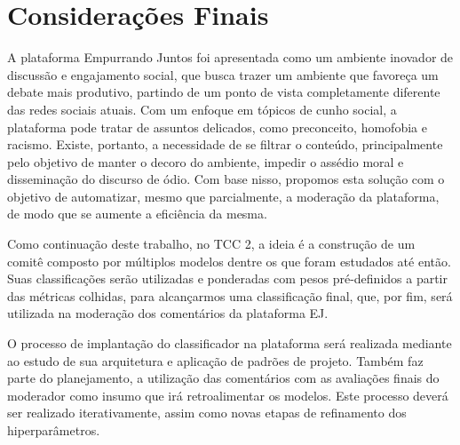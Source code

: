 \chapter{Considerações Finais}

A plataforma Empurrando Juntos foi apresentada como um ambiente inovador de discussão e engajamento social, que busca trazer um ambiente que favoreça um debate mais produtivo, partindo de um ponto de vista completamente diferente das redes sociais atuais. Com um enfoque em tópicos de cunho social, a plataforma pode tratar de assuntos delicados, como preconceito, homofobia e racismo. Existe, portanto, a necessidade de se filtrar o conteúdo, principalmente pelo objetivo de manter o decoro do ambiente, impedir o assédio moral e disseminação do discurso de ódio. Com base nisso, propomos esta solução com o objetivo de automatizar, mesmo que parcialmente, a moderação da plataforma, de modo que se aumente a eficiência da mesma.

Como continuação deste trabalho, no TCC 2, a ideia é a construção de um comitê composto por múltiplos modelos dentre os que foram estudados até então. Suas classificações serão utilizadas e ponderadas com pesos pré-definidos a partir das métricas colhidas, para alcançarmos uma classificação final, que, por fim, será utilizada na moderação dos comentários da plataforma EJ.
	
O processo de implantação do classificador na plataforma será realizada mediante ao estudo de sua arquitetura e aplicação de padrões de projeto. Também faz parte do planejamento, a utilização das comentários com as avaliações finais do moderador como insumo que irá retroalimentar os modelos. Este processo deverá ser realizado iterativamente, assim como novas etapas de refinamento dos hiperparâmetros. 
